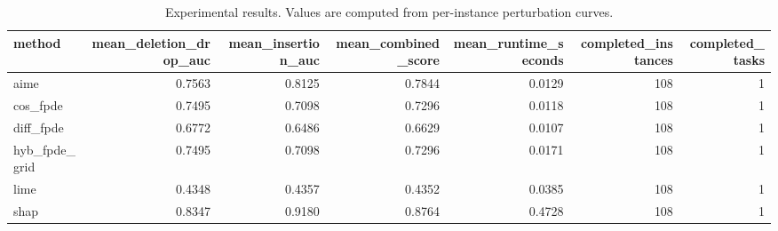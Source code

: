 \begin{table}[t]
\caption{Experimental results. Values are computed from per-instance perturbation curves.}
\label{tab:main_results_computed}
\centering
\begin{tabular}{lrrrrrr}
\toprule
method & mean\_deletion\_drop\_auc & mean\_insertion\_auc & mean\_combined\_score & mean\_runtime\_seconds & completed\_instances & completed\_tasks \\
\midrule
aime & 0.7563 & 0.8125 & 0.7844 & 0.0129 & 108 & 1 \\
cos\_fpde & 0.7495 & 0.7098 & 0.7296 & 0.0118 & 108 & 1 \\
diff\_fpde & 0.6772 & 0.6486 & 0.6629 & 0.0107 & 108 & 1 \\
hyb\_fpde\_grid & 0.7495 & 0.7098 & 0.7296 & 0.0171 & 108 & 1 \\
lime & 0.4348 & 0.4357 & 0.4352 & 0.0385 & 108 & 1 \\
shap & 0.8347 & 0.9180 & 0.8764 & 0.4728 & 108 & 1 \\
\bottomrule
\end{tabular}

\end{table}
